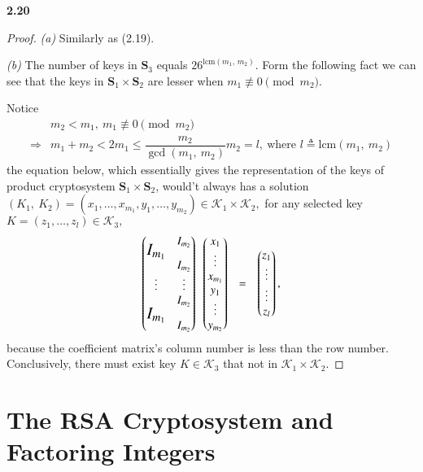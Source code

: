 \documentclass[12pt,a4paper]{article}
\newcommand{\pk}{\mathscr{K}}
\newcommand{\bs}{\mathbf{S}}
\newcommand{\lra}{\Longrightarrow}
\theoremstyle{solution}
\begin{document}
\textbf{2.20}

\begin{proof}
{\em (a) }Similarly as (2.19).

{\em (b) }The number of keys in $\bs_3$ equals $26^{\mathrm{lcm}(m_1,\,m_2)}$. Form the following fact we can see that the keys in $\bs_1 \times \bs_2$ are lesser when $m_1 \nequiv 0 \pmod{m_2}$.

Notice
$$
\begin{array}{rl}
     & m_2 < m_1,~m_1 \nequiv 0 \pmod{m_2}\\
\lra & m_1+m_2 < 2 m_1 \leq \dfrac{m_2}{\gcd(m_1,~m_2)}m_2=l,~\text{where } l \triangleq \mathrm{lcm}(m_1,~m_2)
\end{array}
$$
the equation below, which essentially gives the representation of the keys of product cryptosystem $\bs_1 \times \bs_2$, would't always has a solution $(K_1,~K_2)=(x_1,\ldots,x_{m_1},y_1,\ldots,y_{m_2})\in \pk_1 \times \pk_2,$ for any selected key $K=(z_1,\ldots,z_l)\in \pk_3,$
$$
\begin{array}{ccc}
\begin{pmatrix}
\raisebox{-2ex}{\Large $I_{m_1}$} & I_{m_2}\\
        &I_{m_2}\\
\vdots & \vdots \\
         & I_{m_2}\\
\raisebox{2ex}{\Large $I_{m_1}$}& I_{m_2}
\end{pmatrix}~~
\begin{pmatrix}
x_1 \\ \vdots \\ x_{m_1} \\y_1 \\ \vdots \\y_{m_2}
\end{pmatrix}
&=
& \begin{pmatrix}  z_1\\ \vdots\\ \vdots\\ z_l  \end{pmatrix},
\end{array}
$$
because the coefficient matrix's column number is less than the row number. Conclusively, there must exist key $K\in \pk_3$ that not in $\pk_1 \times \pk_2.$
\end{proof}


\section{The RSA Cryptosystem and Factoring Integers}
\end{document}
